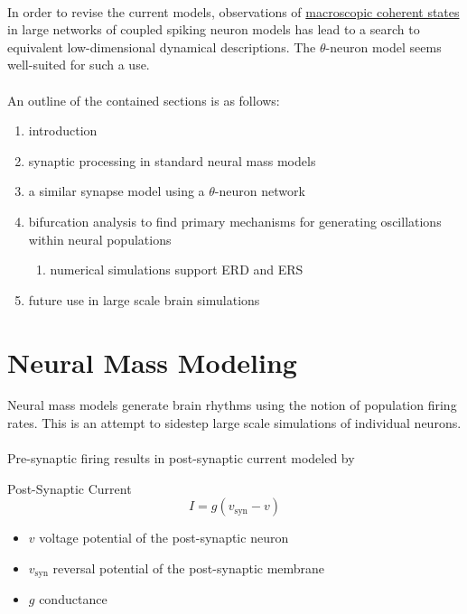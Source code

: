 \documentclass{article}
\begin{document}
\paragraph{}
In order to revise the current models, observations of \underline{macroscopic coherent states} in large networks of coupled spiking neuron models has lead to a search to equivalent low-dimensional dynamical descriptions. The $\theta$-neuron model seems well-suited for such a use.

\paragraph{}
An outline of the contained sections is as follows:
\begin{enumerate}
\item introduction
\item synaptic processing in standard neural mass models
\item a similar synapse model using a $\theta$-neuron network
\item bifurcation analysis to find primary mechanisms for generating oscillations within neural populations
\begin{enumerate}
\item numerical simulations support ERD and ERS
\end{enumerate}
\item future use in large scale brain simulations
\end{enumerate}

\section{Neural Mass Modeling}

Neural mass models generate brain rhythms using the notion of population firing rates. This is an attempt to sidestep large scale simulations of individual neurons.

\paragraph{}
Pre-synaptic firing results in post-synaptic current modeled by
\begin{function}{Post-Synaptic Current}\label{fun:I}
\[ I = g( v_{\text{syn}} - v ) \]
\begin{itemize}[noitemsep]
\item $v$ voltage potential of the post-synaptic neuron
\item $v_{\text{syn}}$ reversal potential of the post-synaptic membrane
\item $g$ conductance
\end{itemize}
\end{function}
\end{document}
